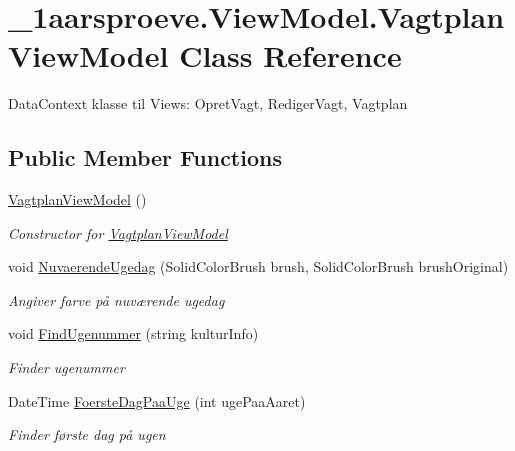 \hypertarget{class__1aarsproeve_1_1_view_model_1_1_vagtplan_view_model}{}\section{\+\_\+1aarsproeve.\+View\+Model.\+Vagtplan\+View\+Model Class Reference}
\label{class__1aarsproeve_1_1_view_model_1_1_vagtplan_view_model}


Data\+Context klasse til Views\+: Opret\+Vagt, Rediger\+Vagt, Vagtplan  


\subsection*{Public Member Functions}
\begin{DoxyCompactItemize}
\item 
\hyperlink{class__1aarsproeve_1_1_view_model_1_1_vagtplan_view_model_a9cd0dee8f4da04199f5fd0dde63cbcda}{Vagtplan\+View\+Model} ()
\begin{DoxyCompactList}\small\item\em Constructor for \hyperlink{class__1aarsproeve_1_1_view_model_1_1_vagtplan_view_model}{Vagtplan\+View\+Model} \end{DoxyCompactList}\item 
void \hyperlink{class__1aarsproeve_1_1_view_model_1_1_vagtplan_view_model_a584ab28ecfddbb2248d7b55a3ed10a34}{Nuvaerende\+Ugedag} (Solid\+Color\+Brush brush, Solid\+Color\+Brush brush\+Original)
\begin{DoxyCompactList}\small\item\em Angiver farve på nuværende ugedag \end{DoxyCompactList}\item 
void \hyperlink{class__1aarsproeve_1_1_view_model_1_1_vagtplan_view_model_a5e3b5ba40e74748da6c018f8547d8baa}{Find\+Ugenummer} (string kultur\+Info)
\begin{DoxyCompactList}\small\item\em Finder ugenummer \end{DoxyCompactList}\item 
Date\+Time \hyperlink{class__1aarsproeve_1_1_view_model_1_1_vagtplan_view_model_a8b8894a622f861e335c3e171a4ba93bc}{Foerste\+Dag\+Paa\+Uge} (int uge\+Paa\+Aaret)
\begin{DoxyCompactList}\small\item\em Finder første dag på ugen \end{DoxyCompactList}\item 

\end{DoxyCompactItemize}
